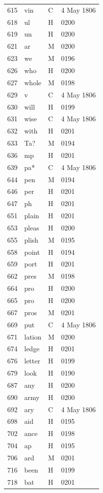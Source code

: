 \begin{longtable}{@{}rlll@{}}
615 & vin & C & 4 May 1806 \\
618 & ul & H & 0200 \\
619 & un & H & 0200 \\
621 & ar & M & 0200 \\
623 & we & M & 0196 \\
626 & who & H & 0200 \\
627 & whole & M & 0198 \\
629 & v & C & 4 May 1806 \\
630 & will & H & 0199 \\
631 & wise & C & 4 May 1806 \\
632 & with & H & 0201 \\
633 & Ta? & M & 0194 \\
636 & mp & H & 0201 \\
639 & pa* & C & 4 May 1806 \\
644 & pen & M & 0194 \\
646 & per & H & 0201 \\
647 & ph & H & 0201 \\
651 & plain & H & 0201 \\
653 & pleas & H & 0200 \\
655 & plish & M & 0195 \\
658 & point & H & 0194 \\
659 & port & H & 0201 \\
662 & pres & M & 0198 \\
664 & pro & H & 0200 \\
665 & pro & H & 0200 \\
667 & pros & M & 0201 \\
669 & put & C & 4 May 1806 \\
671 & lation & M & 0200 \\
674 & ledge & H & 0201 \\
676 & letter & H & 0199 \\
679 & look & H & 0190 \\
687 & any & H & 0200 \\
690 & army & H & 0200 \\
692 & ary & C & 4 May 1806 \\
698 & aid & H & 0195 \\
702 & ance & H & 0198 \\
704 & ap & H & 0195 \\
706 & ard & M & 0201 \\
716 & been & H & 0199 \\
718 & bat & H & 0201 \\

\end{longtable}
